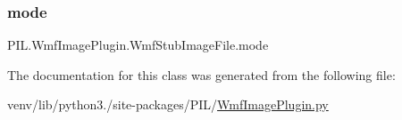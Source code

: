 \mbox{\label{classPIL_1_1WmfImagePlugin_1_1WmfStubImageFile_ab38ff931cc979d5187bb0d1a9e19b0dc}} 
\subsubsection{\texorpdfstring{mode}{mode}}
{\footnotesize\ttfamily P\+I\+L.\+Wmf\+Image\+Plugin.\+Wmf\+Stub\+Image\+File.\+mode}



The documentation for this class was generated from the following file\+:\begin{DoxyCompactItemize}
\item 
venv/lib/python3./site-\/packages/\+P\+I\+L/\hyperlink{WmfImagePlugin_8py}{Wmf\+Image\+Plugin.\+py}\end{DoxyCompactItemize}
